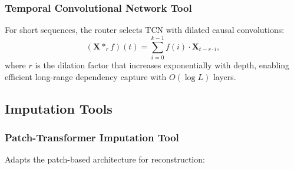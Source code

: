 \subsubsection{Temporal Convolutional Network Tool}
For short sequences, the router selects TCN with dilated causal convolutions:
\begin{equation}
    (\mathbf{X} *_r f)(t) = \sum_{i=0}^{k-1} f(i) \cdot \mathbf{X}_{t - r \cdot i},
\end{equation}
where $r$ is the dilation factor that increases exponentially with depth, enabling efficient long-range dependency capture with $O(\log L)$ layers.

\subsection{Imputation Tools}
\label{appx:imputation_tools}

\begin{table}[h]
\centering
\caption{Imputation Tools Overview}
\label{tab:imputation_tools}
\end{table}

\subsubsection{Patch-Transformer Imputation Tool}
Adapts the patch-based architecture for reconstruction:

